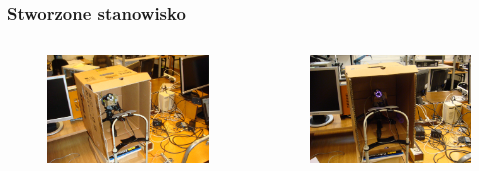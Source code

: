 \documentclass{beamer}
\begin{document}
\begin{frame}
\frametitle{Stworzone stanowisko}
\begin{columns}
		\begin{figure}
		\begin{center}
		\includegraphics[scale=0.05]{stanowisko1.jpg}
		\end{center}
		\end{figure}
		\begin{figure}
		\begin{center}
		\includegraphics[scale=0.05]{stanowisko2.jpg}
		\end{center}
		\end{figure}
\end{columns}\end{frame}
\end{document}
